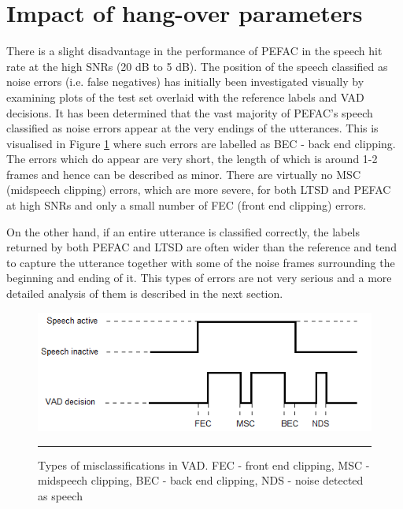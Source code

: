 \clearpage


\section{Impact of hang-over parameters}

There is a slight disadvantage in the performance of PEFAC in the speech hit rate at the high SNRs (20 dB to 5 dB). The position of the speech classified as noise errors (i.e. false negatives) has initially been investigated visually by examining plots of the test set overlaid with the reference labels and VAD decisions. It has been determined that the vast majority of PEFAC's speech classified as noise errors appear at the very endings of the utterances. This is visualised in Figure \ref{fig:clipping} where such errors are labelled as BEC - back end clipping. The errors which do appear are very short, the length of which is around 1-2 frames and hence can be described as minor. There are virtually no MSC (midspeech clipping) errors, which are more severe, for both LTSD and PEFAC at high SNRs and only a small number of FEC (front end clipping) errors.

On the other hand, if an entire utterance is classified correctly, the labels returned by both PEFAC and LTSD are often wider than the reference and tend to capture the utterance together with some of the noise frames surrounding the beginning and ending of it. This types of errors are not very serious and a more detailed analysis of them is described in the next section. 

\begin{figure}[htbp]
	\centering
		\includegraphics[width=1.0\columnwidth]{Figures/Chapter5/clipping.png}
		\rule{37em}{0.5pt}
	\caption[Types of misclassifications in VAD]{Types of misclassifications in VAD. FEC - front end clipping, MSC - midspeech clipping, BEC - back end clipping, NDS - noise detected as speech}
	\label{fig:clipping}
\end{figure}

